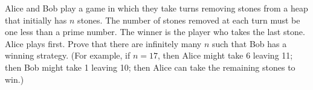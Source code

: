 Alice and Bob play a game in which they take turns removing stones from
a heap that initially has $n$ stones. The number of stones removed at
each turn must be one less than a prime number. The winner is the player
who takes the last stone. Alice plays first. Prove that there are
infinitely many $n$ such that Bob has a winning strategy.
(For example, if $n=17$, then Alice might take 6 leaving 11; then
Bob might take 1 leaving 10; then Alice can take the remaining stones
to win.)
